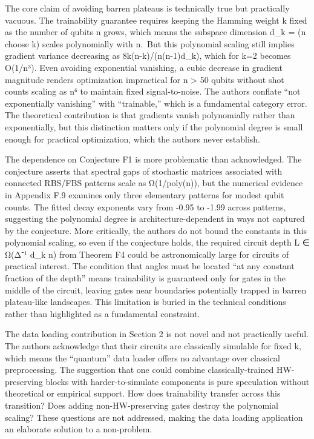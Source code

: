 \documentclass[10pt,letterpaper]{article}
\begin{document}
The core claim of avoiding barren plateaus is technically true but practically vacuous. The trainability guarantee requires keeping the Hamming weight k fixed as the number of qubits n grows, which means the subspace dimension d\_k = (n choose k) scales polynomially with n.~But this polynomial scaling still implies gradient variance decreasing as 8k(n-k)/(n(n-1)d\_k), which for k=2 becomes O(1/n³). Even avoiding exponential vanishing, a cubic decrease in gradient magnitude renders optimization impractical for n \textgreater{} 50 qubits without shot counts scaling as n⁶ to maintain fixed signal-to-noise. The authors conflate ``not exponentially vanishing'' with ``trainable,'' which is a fundamental category error. The theoretical contribution is that gradients vanish polynomially rather than exponentially, but this distinction matters only if the polynomial degree is small enough for practical optimization, which the authors never establish.

The dependence on Conjecture F1 is more problematic than acknowledged. The conjecture asserts that spectral gaps of stochastic matrices associated with connected RBS/FBS patterns scale as Ω(1/poly(n)), but the numerical evidence in Appendix F.9 examines only three elementary patterns for modest qubit counts. The fitted decay exponents vary from -0.95 to -1.99 across patterns, suggesting the polynomial degree is architecture-dependent in ways not captured by the conjecture. More critically, the authors do not bound the constants in this polynomial scaling, so even if the conjecture holds, the required circuit depth L ∈ Ω(Δ⁻¹ d\_k n) from Theorem F4 could be astronomically large for circuits of practical interest. The condition that angles must be located ``at any constant fraction of the depth'' means trainability is guaranteed only for gates in the middle of the circuit, leaving gates near boundaries potentially trapped in barren plateau-like landscapes. This limitation is buried in the technical conditions rather than highlighted as a fundamental constraint.

The data loading contribution in Section 2 is not novel and not practically useful. The authors acknowledge that their circuits are classically simulable for fixed k, which means the ``quantum'' data loader offers no advantage over classical preprocessing. The suggestion that one could combine classically-trained HW-preserving blocks with harder-to-simulate components is pure speculation without theoretical or empirical support. How does trainability transfer across this transition? Does adding non-HW-preserving gates destroy the polynomial scaling? These questions are not addressed, making the data loading application an elaborate solution to a non-problem.
\end{document}
